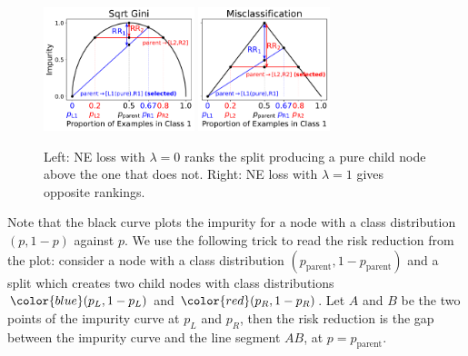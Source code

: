 \documentclass[letterpaper]{article} %
\begin{document}
\begin{figure}[h]
    \centering
    \includegraphics[height=3.6cm]{figs/r2_sqrtgini.pdf}
    \includegraphics[height=3.6cm]{figs/r2_misc.pdf}
    \caption{
    Left: NE loss with $\lambda=0$ ranks the split producing a pure child node above the one that does not. 
    Right: NE loss with $\lambda=1$ gives opposite rankings.
    }
    \label{fig:alternate_early_stopping}
\end{figure}

Note that the black curve plots the impurity for a node with a class distribution $(p, 1-p)$ against $p$.
We use the following trick to read the risk reduction from the plot:
consider a node with a class distribution $(p_{\text{parent}}, 1-p_{\text{parent}})$ and 
a split which creates two child nodes with class distributions ${\color{blue}(p_{L}, 1-p_{L})}$ and 
${\color{red}(p_{R}, 1-p_{R})}$.
Let $A$ and $B$ be the two points of the impurity curve at $p_{L}$ and $p_{R}$, then
the risk reduction is the gap between the impurity curve and the line segment $AB$, at $p=p_{\text{parent}}$.
\end{document}
